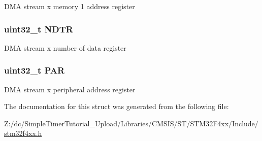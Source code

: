D\-M\-A stream x memory 1 address register \hypertarget{struct_d_m_a___stream___type_def_af60258ad5a25addc1e8969665d0c1731}{
\subsubsection[{N\-D\-T\-R}]{ uint32\-\_\-t N\-D\-T\-R}}\label{struct_d_m_a___stream___type_def_af60258ad5a25addc1e8969665d0c1731}
D\-M\-A stream x number of data register \hypertarget{struct_d_m_a___stream___type_def_aef55be3d948c22dd32a97e8d4f8761fd}{
\subsubsection[{P\-A\-R}]{ uint32\-\_\-t P\-A\-R}}\label{struct_d_m_a___stream___type_def_aef55be3d948c22dd32a97e8d4f8761fd}
D\-M\-A stream x peripheral address register 

The documentation for this struct was generated from the following file\-:\begin{DoxyCompactItemize}
\item 
Z\-:/dc/\-Simple\-Timer\-Tutorial\-\_\-\-Upload/\-Libraries/\-C\-M\-S\-I\-S/\-S\-T/\-S\-T\-M32\-F4xx/\-Include/\hyperlink{stm32f4xx_8h}{stm32f4xx.\-h}\end{DoxyCompactItemize}

